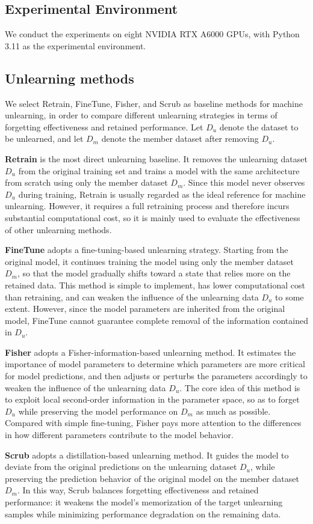 \documentclass{article}
\theoremstyle{plain}
\theoremstyle{definition}
\theoremstyle{remark}
\begin{document}
\subsection{Experimental Environment}
We conduct the experiments on eight NVIDIA RTX A6000 GPUs, with Python 3.11 as the experimental environment.
\subsection{Unlearning methods} \label{unlearning}
We select Retrain, FineTune, Fisher, and Scrub as baseline methods for machine unlearning, in order to compare different unlearning strategies in terms of forgetting effectiveness and retained performance. Let $D_u$ denote the dataset to be unlearned, and let $D_m$ denote the member dataset after removing $D_u$.

\textbf{Retrain} is the most direct unlearning baseline. It removes the unlearning dataset $D_u$ from the original training set and trains a model with the same architecture from scratch using only the member dataset $D_m$. Since this model never observes $D_u$ during training, Retrain is usually regarded as the ideal reference for machine unlearning. However, it requires a full retraining process and therefore incurs substantial computational cost, so it is mainly used to evaluate the effectiveness of other unlearning methods.

\textbf{FineTune} adopts a fine-tuning-based unlearning strategy. Starting from the original model, it continues training the model using only the member dataset $D_m$, so that the model gradually shifts toward a state that relies more on the retained data. This method is simple to implement, has lower computational cost than retraining, and can weaken the influence of the unlearning data $D_u$ to some extent. However, since the model parameters are inherited from the original model, FineTune cannot guarantee complete removal of the information contained in $D_u$.

\textbf{Fisher} adopts a Fisher-information-based unlearning method. It estimates the importance of model parameters to determine which parameters are more critical for model predictions, and then adjusts or perturbs the parameters accordingly to weaken the influence of the unlearning data $D_u$. The core idea of this method is to exploit local second-order information in the parameter space, so as to forget $D_u$ while preserving the model performance on $D_m$ as much as possible. Compared with simple fine-tuning, Fisher pays more attention to the differences in how different parameters contribute to the model behavior.

\textbf{Scrub} adopts a distillation-based unlearning method. It guides the model to deviate from the original predictions on the unlearning dataset $D_u$, while preserving the prediction behavior of the original model on the member dataset $D_m$. In this way, Scrub balances forgetting effectiveness and retained performance: it weakens the model's memorization of the target unlearning samples while minimizing performance degradation on the remaining data.
\end{document}
